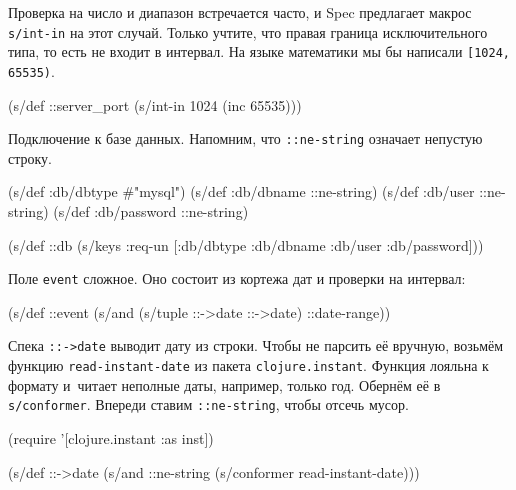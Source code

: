 
Проверка на число и диапазон встречается часто, и Spec предлагает макрос
\verb|s/int-in| на этот случай. Только учтите, что правая граница
исключительного типа, то есть не входит в интервал. На языке математики мы бы
написали \verb|[1024, 65535)|.

\begin{english}
  \begin{clojure}
(s/def ::server_port
  (s/int-in 1024 (inc 65535)))
  \end{clojure}
\end{english}


\noindent
Подключение к базе данных. Напомним, что \verb|::ne-string| означает
непустую строку.

\begin{english}
  \begin{clojure}
(s/def :db/dbtype   #{"mysql"})
(s/def :db/dbname   ::ne-string)
(s/def :db/user     ::ne-string)
(s/def :db/password ::ne-string)

(s/def ::db
  (s/keys :req-un [:db/dbtype
                   :db/dbname
                   :db/user
                   :db/password]))
  \end{clojure}
\end{english}

Поле \verb|event| сложное. Оно состоит из кортежа дат и проверки на интервал:

\begin{english}
  \begin{clojure}
(s/def ::event
  (s/and (s/tuple ::->date ::->date)
         ::date-range))
  \end{clojure}
\end{english}


Спека \verb|::->date| выводит дату из строки. Чтобы не парсить её вручную,
возьмём функцию \verb|read-instant-date| из пакета \verb|clojure.instant|.
Функция лояльна к формату и~читает неполные даты, например, только год.
Обернём её в \verb|s/conformer|. Впереди ставим \verb|::ne-string|,
чтобы отсечь мусор.


\begin{english}
  \begin{clojure}
(require '[clojure.instant :as inst])

(s/def ::->date
  (s/and ::ne-string (s/conformer read-instant-date)))
  \end{clojure}
\end{english}


